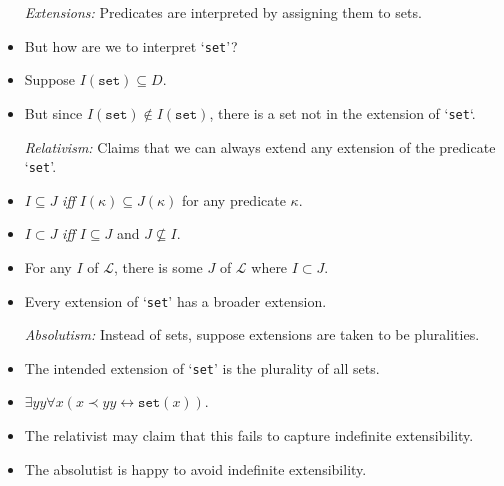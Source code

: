\documentclass[a4paper, 11pt]{article} %
\renewcommand{\L}{\mathcal{L}}
\begin{document}
\begin{itemize}
  \item[\it Extensions:] Predicates are interpreted by assigning them to sets.
    \item But how are we to interpret `\texttt{set}'?
    \item Suppose $I(\texttt{set}) \subseteq D$.
    \item But since $I(\texttt{set}) \notin I(\texttt{set})$, there is a set not in the extension of `\texttt{set}`.
  \item[\it Relativism:] Claims that we can always extend any extension of the predicate `\texttt{set}'.
    \item $I \subseteq J$ \textit{iff} $I(\kappa) \subseteq J(\kappa)$ for any predicate $\kappa$.
    \item $I \subset J$ \textit{iff} $I \subseteq J$ and $J \nsubseteq I$. 
    \item For any $I$ of $\L$, there is some $J$ of $\L$ where $I \subset J$.
    \item Every extension of `\texttt{set}' has a broader extension.
  \item[\it Absolutism:] Instead of sets, suppose extensions are taken to be pluralities.
    \item The intended extension of `\texttt{set}' is the plurality of all sets.
    \item $\exists yy \forall x ( x \prec yy \leftrightarrow \texttt{set}(x) )$.
    \item The relativist may claim that this fails to capture indefinite extensibility.
    \item The absolutist is happy to avoid indefinite extensibility.
\end{itemize}
\end{document}
